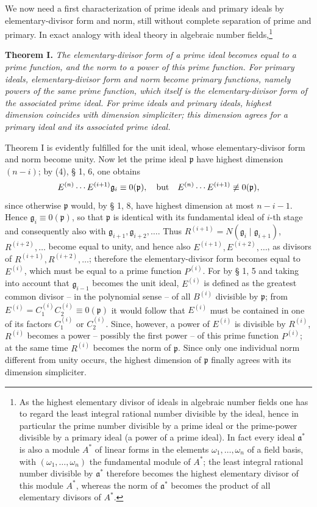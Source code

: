 \documentclass[11pt]{article}
\providecommand{\frakp}{\mathfrak p}
\providecommand{\fraka}{\mathfrak a}
\providecommand{\frakg}{\mathfrak g}
\providecommand{\fraka}{\mathfrak a}
\providecommand{\frakp}{\mathfrak p}
\providecommand{\frakp}{\mathfrak p}
\begin{document}
We now need a first characterization of prime ideals and primary ideals by elementary-divisor form and norm, still without complete separation of prime and primary. In exact analogy with ideal theory in algebraic number fields,\footnote{As the highest elementary divisor of ideals in algebraic number fields one has to regard the least integral rational number divisible by the ideal, hence in particular the prime number divisible by a prime ideal or the prime-power divisible by a primary ideal (a power of a prime ideal). In fact every ideal $\fraka^*$ is also a module $A^*$ of linear forms in the elements $\omega_1,\ldots,\omega_n$ of a field basis, with $(\omega_1,\ldots,\omega_n)$ the fundamental module of $A^*$; the least integral rational number divisible by $\fraka^*$ therefore becomes the highest elementary divisor of this module $A^*$, whereas the norm of $\fraka^*$ becomes the product of all elementary divisors of $A^*$.}

\textbf{Theorem I.} \emph{The elementary-divisor form of a prime ideal becomes equal to a prime function, and the norm to a power of this prime function. For primary ideals, elementary-divisor form and norm become primary functions, namely powers of the same prime function, which itself is the elementary-divisor form of the associated prime ideal. For prime ideals and primary ideals, highest dimension coincides with dimension simpliciter; this dimension agrees for a primary ideal and its associated prime ideal.}

Theorem I is evidently fulfilled for the unit ideal, whose elementary-divisor form and norm become unity. Now let the prime ideal $\frakp$ have highest dimension $(n-i)$; by (4), § 1, 6, one obtains
\[
 E^{(n)}\cdots E^{(i+1)}\frakg_i\equiv0(\frakp),\quad\hbox{but}\quad
 E^{(n)}\cdots E^{(i+1)}\not\equiv0(\frakp),
\]
since otherwise $\frakp$ would, by § 1, 8, have highest dimension at most $n-i-1$. Hence $\frakg_i\equiv0(\frakp)$, so that $\frakp$ is identical with its fundamental ideal of $i$-th stage and consequently also with $\frakg_{i+1},\frakg_{i+2},\ldots$. Thus $R^{(i+1)}=N(\frakg_i\mid\frakg_{i+1})$, $R^{(i+2)},\ldots$ become equal to unity, and hence also $E^{(i+1)},E^{(i+2)},\ldots$, as divisors of $R^{(i+1)},R^{(i+2)},\ldots$; therefore the elementary-divisor form becomes equal to $E^{(i)}$, which must be equal to a prime function $P^{(i)}$. For by § 1, 5 and taking into account that $\frakg_{i-1}$ becomes the unit ideal, $E^{(i)}$ is defined as the greatest common divisor -- in the polynomial sense -- of all $B^{(i)}$ divisible by $\frakp$; from $E^{(i)}=C_1^{(i)}C_2^{(i)}\equiv0(\frakp)$ it would follow that $E^{(i)}$ must be contained in one of its factors $C_1^{(i)}$ or $C_2^{(i)}$. Since, however, a power of $E^{(i)}$ is divisible by $R^{(i)}$, $R^{(i)}$ becomes a power -- possibly the first power -- of this prime function $P^{(i)}$; at the same time $R^{(i)}$ becomes the norm of $\frakp$. Since only one individual norm different from unity occurs, the highest dimension of $\frakp$ finally agrees with its dimension simpliciter.
\end{document}
